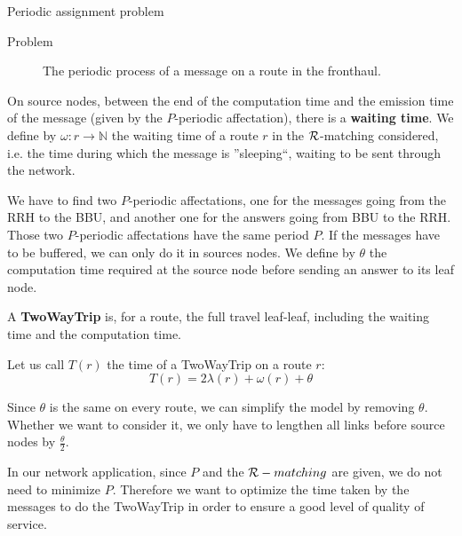 \documentclass[a4paper,10pt]{report}
\begin{document}
\begin{chapter}{Periodic assignment problem}
\begin{section}{Problem}
\begin{center}
{{\begin{figure}[H]
\begin{center}
{
}
\end{center}
\caption{The periodic process of a message on a route in the fronthaul.}
\end{figure}

}}\end{center}


On source nodes, between the end of the computation time and the emission time of the message (given by the $P$-periodic affectation), there is a {\bf waiting time}. 
We define by $\omega: r \rightarrow \mathbb{N}$ the waiting time of a route $r$ in the ${\cal R}$-matching considered, i.e. the time during which the
message is ''sleeping``, waiting to be sent through the network.


We have to find two $P$-periodic affectations, one for the messages going from the RRH to the BBU, and another one for the answers going from BBU to the RRH. Those two $P$-periodic affectations have the same period $P$. 
If the messages have to be buffered, we can only do it in sources nodes.
We define by $\theta$ the computation time required at the source node before sending an answer to its leaf node.

A {\bf TwoWayTrip} is, for a route, the full travel leaf-leaf, including the waiting time and the computation time.

Let us call $T (r)$ the time of a TwoWayTrip on a route $r$: $$ T (r) = 2\lambda (r) + \omega (r) + \theta$$

Since $\theta$ is the same on every route, we can simplify the model by removing $\theta$. Whether we want to consider it, we only have to lengthen all 
links before source nodes by $\frac{\theta}{2}$. 


In our network application, since $P$ and the ${\cal R}-matching$ are given, we do not need to minimize $P$.
Therefore we want to optimize the time taken by the messages to do the TwoWayTrip in order to ensure a good level of quality of service.


\end{section}
\end{chapter}
\end{document}
